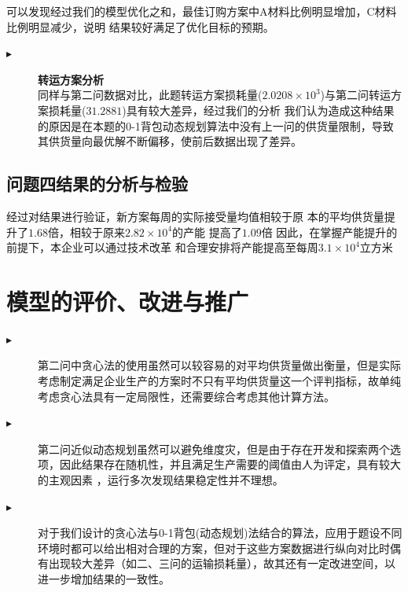 \documentclass[withoutpreface,bwprint]{cumcmthesis}
\begin{document}
可以发现经过我们的模型优化之和，最佳订购方案中A材料比例明显增加，C材料比例明显减少，说明
结果较好满足了优化目标的预期。

\begin{description}
 
\item[$\blacktriangleright$] \textbf{转运方案分析}\\
 同样与第二问数据对比，此题转运方案损耗量($2.0208 \times 10^ 3$)与第二问转运方案损耗量($31.2881$)具有较大差异，经过我们的分析
 我们认为造成这种结果的原因是在本题的0-1背包动态规划算法中没有上一问的供货量限制，导致其供货量向最优解不断偏移，使前后数据出现了差异。
\end{description}
\subsection{问题四结果的分析与检验}
经过对结果进行验证，新方案每周的实际接受量均值相较于原
本的平均供货量提升了$1.68$倍，相较于原来$2.82 \times 10^4$的产能
提高了$1.09$倍
因此，在掌握产能提升的前提下，本企业可以通过技术改革
和合理安排将产能提高至每周$3.1 \times 10^ 4$立方米

\section{模型的评价、改进与推广}
\begin{description}
    \item[$\blacktriangleright$] 第二问中贪心法的使用虽然可以较容易的对平均供货量做出衡量，但是实际考虑制定满足企业生产的方案时不只有平均供货量这一个评判指标，故单纯考虑贪心法具有一定局限性，还需要综合考虑其他计算方法。
    \item[$\blacktriangleright$] 第二问近似动态规划虽然可以避免维度灾，但是由于存在开发和探索两个选项，因此结果存在随机性，并且满足生产需要的阈值由人为评定，具有较大的主观因素 ，运行多次发现结果稳定性并不理想。

\end{description}
\begin{description}
    \item[$\blacktriangleright$] 对于我们设计的贪心法与0-1背包(动态规划)法结合的算法，应用于题设不同环境时都可以给出相对合理的方案，但对于这些方案数据进行纵向对比时偶有出现较大差异（如二、三问的运输损耗量），故其还有一定改进空间，以进一步增加结果的一致性。
\end{description}
\end{document}
